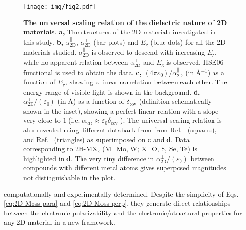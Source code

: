 \documentclass[journal=ancac3,manuscript=article,email=true,hyperref=true,keywords=false]{achemso}
\begin{document}
\begin{figure}[H]
\centering
\texttt{[image: img/fig2.pdf]}
\caption{\label{fig-3} \textbf{The universal scaling relation of the
    dielectric nature of 2D materials}. 
    \textbf{a,} The structures of
  the 2D materials investigated in this 
  study. 
  \textbf{b,} $\alpha_{\mathrm{2D}}^{\parallel}$,
  $\alpha_{\mathrm{2D}}^{\perp}$ (bar plots) and $E_{\mathrm{g}}$
  (blue dots) for all the 2D materials studied.
  $\alpha_{\mathrm{2D}}^{\parallel}$ is observed to descend with
  increasing $E_{\mathrm{g}}$, while no apparent relation between
  $\alpha_{\mathrm{2D}}^{\perp}$ and $E_{\mathrm{g}}$ is
  observed. HSE06 functional is used to obtain the data. 
  \textbf{c,} $(4\pi \varepsilon_{0})/\alpha_{\mathrm{2D}}^{\parallel}$ (in
  \AA{}$^{-1}$) as a function of $E_{\mathrm{g}}$, showing a linear
  correlation between each other. The energy range of visible light is
  shown in the background. 
  \textbf{d,} $\alpha_{\mathrm{2D}}^{\perp}/(\varepsilon_{0})$ (in \AA{}) as a
  function of $\delta_{\mathrm{cov}}$ (definition schematically shown
  in the inset), showing a perfect linear relation with a slope very
  close to $1$ (i.e.
  $\alpha_{\mathrm{2D}}^{\perp} \approx \varepsilon_{0}
  \delta_{\mathrm{cov}}$ ). The universal scaling relation is also
  revealed using different databank from 
  from Ref.~ (squares),
  and Ref.~ (triangles) as superimposed on
  \textbf{c} and \textbf{d}. Data corresponding to 2H-MX$_2$ 
  (M=Mo, W; X=O, S, Se, Te) is highlighted in {\bf d}. The very tiny 
  difference in $\alpha_{\mathrm{2D}}^{\perp}/(\varepsilon_{0})$
  between compounds with different metal atoms 
  gives superposed magnitudes not distinguishable in the plot. 
  }
\end{figure}
%
%
computationally and experimentally determined. Despite the
simplicity of Eqs. \ref{eq:2D-Moss-para} and \ref{eq:2D-Moss-perp},
they generate direct relationships between the electronic polarizability and
the electronic/structural properties for any 2D material in a new
framework.
\end{document}
